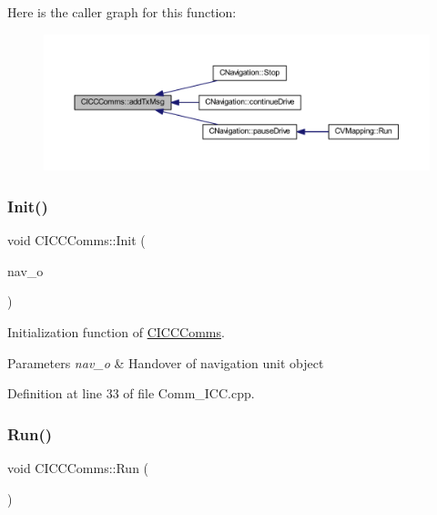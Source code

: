 Here is the caller graph for this function\+:
\nopagebreak
\begin{figure}[H]
\begin{center}
\leavevmode
\includegraphics[width=350pt]{class_c_i_c_c_comms_ab925dd7ff82f30ccd9f770ab2281b3ab_icgraph}
\end{center}
\end{figure}
\mbox{\label{class_c_i_c_c_comms_ad1d35d2145363d2ab970f9f5cd1dfc23}} 
\subsubsection{\texorpdfstring{Init()}{Init()}}
{\footnotesize\ttfamily void C\+I\+C\+C\+Comms\+::\+Init (\begin{DoxyParamCaption}\item[{\mbox{\hyperlink{class_c_navigation}{C\+Navigation}} $\ast$}]{nav\+\_\+o }\end{DoxyParamCaption})\hspace{0.3cm}{\ttfamily [virtual]}}



Initialization function of \mbox{\hyperlink{class_c_i_c_c_comms}{C\+I\+C\+C\+Comms}}. 


\begin{DoxyParams}{Parameters}
{\em nav\+\_\+o} & Handover of navigation unit object \\
\hline
\end{DoxyParams}


Definition at line 33 of file Comm\+\_\+\+I\+C\+C.\+cpp.

\mbox{\label{class_c_i_c_c_comms_a8b3fa81307b3b9ba0e72b4aee8279c56}} 
\subsubsection{\texorpdfstring{Run()}{Run()}}
{\footnotesize\ttfamily void C\+I\+C\+C\+Comms\+::\+Run (\begin{DoxyParamCaption}\item[{void}]{ }\end{DoxyParamCaption})\hspace{0.3cm}{\ttfamily [virtual]}}



